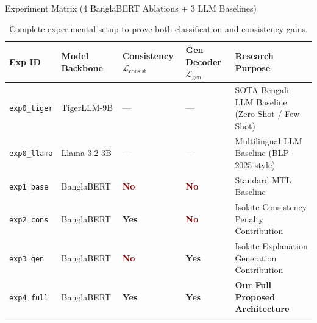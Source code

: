\documentclass[10pt, aspectratio=169]{beamer}
\begin{document}
\begin{frame}{Experiment Matrix (4 BanglaBERT Ablations + 3 LLM Baselines)}
    \begin{table}
        \centering
        \scriptsize
        \begin{tabular}{llllp{4.5cm}}
            \toprule
            \textbf{Exp ID} & \textbf{Model Backbone} & \textbf{Consistency $\mathcal{L}_{\text{consist}}$} & \textbf{Gen Decoder $\mathcal{L}_{\text{gen}}$} & \textbf{Research Purpose} \\
            \midrule
            \texttt{exp0\_tiger} & TigerLLM-9B & --- & --- & SOTA Bengali LLM Baseline (Zero-Shot / Few-Shot) \\
            \texttt{exp0\_llama} & Llama-3.2-3B & --- & --- & Multilingual LLM Baseline (BLP-2025 style) \\
            \midrule
            \texttt{exp1\_base} & BanglaBERT & \textcolor{DarkRed}{\textbf{No}} & \textcolor{DarkRed}{\textbf{No}} & Standard MTL Baseline \\
            \texttt{exp2\_cons} & BanglaBERT & \textcolor{TealAccent}{\textbf{Yes}} & \textcolor{DarkRed}{\textbf{No}} & Isolate Consistency Penalty Contribution \\
            \texttt{exp3\_gen} & BanglaBERT & \textcolor{DarkRed}{\textbf{No}} & \textcolor{TealAccent}{\textbf{Yes}} & Isolate Explanation Generation Contribution \\
            \texttt{exp4\_full} & BanglaBERT & \textcolor{TealAccent}{\textbf{Yes}} & \textcolor{TealAccent}{\textbf{Yes}} & \textbf{Our Full Proposed Architecture} \\
            \bottomrule
        \end{tabular}
        \caption{Complete experimental setup to prove both classification and consistency gains.}
    \end{table}
\end{frame}
\end{document}
